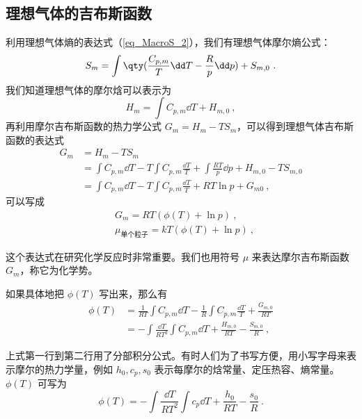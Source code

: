 \subsection{理想气体的吉布斯函数}
利用理想气体熵的表达式（\autoref{eq_MacroS_2}），我们有理想气体摩尔熵公式：
\begin{equation}
S_m=\int \qty(\frac{C_{p,m}}{T}\dd T-\frac{R}{p}\dd p)+S_{m,0}~.
\end{equation}
我们知道理想气体的摩尔焓可以表示为
\begin{equation}
H_m=\int C_{p,m}\dd T+H_{m,0}~,
\end{equation}
再利用摩尔吉布斯函数的热力学公式 $G_m=H_m-TS_m$，可以得到理想气体吉布斯函数的表达式
\begin{equation}
\begin{aligned}
G_m&=H_m-TS_m\\
&=\int C_{p,m} \dd T - T\int C_{p,m} \frac{\dd T}{T}+\int \frac{RT}{p}\dd p +H_{m,0}-TS_{m,0}
\\
&=\int C_{p,m} \dd T - T\int C_{p,m} \frac{\dd T}{T}+RT\ln p+G_{m0}~,
\end{aligned}
\end{equation}
可以写成
\begin{equation}\label{eq_GibbsG_3}
\begin{aligned}
&G_m=RT(\phi(T)+\ln p)~,\\
&\mu_{\text{单个粒子}} = kT(\phi(T)+\ln p)~,
\end{aligned}
\end{equation}

这个表达式在研究化学反应时非常重要。我们也用符号 $\mu$ 来表达摩尔吉布斯函数 $G_m$，称它为化学势。

如果具体地把 $\phi(T)$ 写出来，那么有
\begin{equation}\label{eq_GibbsG_4}
\begin{aligned}
\phi(T)&=\frac{1}{RT}\int C_{p,m}\dd T-\frac{1}{R}\int C_{p,m}\frac{\dd T}{T}+\frac{G_{m,0}}{RT}\\
&=-\int \frac{\dd T}{RT^2}\int C_{p,m}\dd T+\frac{H_{m,0}}{RT}-\frac{S_{m,0}}{R}~,
\end{aligned}
\end{equation}

上式第一行到第二行用了分部积分公式。有时人们为了书写方便，用小写字母来表示摩尔的热力学量，例如 $h_0,c_p,s_0$ 表示每摩尔的焓常量、定压热容、熵常量。$\phi(T)$ 可写为
\begin{equation}
\phi(T)=-\int\frac{\dd T}{RT^2}\int c_{p}\dd T+\frac{h_{0}}{RT}-\frac{s_{0}}{R}~.
\end{equation}

